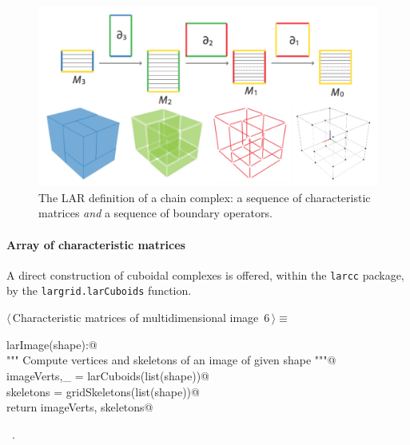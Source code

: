 \documentclass[11pt,oneside]{article}	%
\begin{document}
\begin{figure}[htbp] %
   \centering
   \includegraphics[width=0.7\linewidth]{images/larcomplex} 
   \caption{The LAR definition of  a chain complex: a sequence of characteristic matrices \emph{and} a sequence of boundary operators.}
   \label{fig:example}
\end{figure}

\paragraph{Array of characteristic matrices}

A direct construction of cuboidal complexes is offered, within the \texttt{larcc} package, by the \texttt{largrid.larCuboids} function. 

\begin{flushleft} \small
\begin{minipage}{\linewidth} \label{scrap9}
\protect{}$\langle\,$Characteristic matrices of multidimensional image\nobreak\ {\footnotesize 6}$\,\rangle\equiv$
\vspace{-1ex}
\begin{list}{}{} \item
\mbox{}\verb@def larImage(shape):@\\
\mbox{}\verb@   """ Compute vertices and skeletons of an image of given shape """@\\
\mbox{}\verb@   imageVerts,_ = larCuboids(list(shape))@\\
\mbox{}\verb@   skeletons = gridSkeletons(list(shape))@\\
\mbox{}\verb@   return imageVerts, skeletons@\\
\mbox{}\verb@@{\NWsep}
\end{list}
\vspace{-1ex}
\footnotesize\addtolength{\baselineskip}{-1ex}
\begin{list}{}{\setlength{\itemsep}{-\parsep}\setlength{\itemindent}{-\leftmargin}}
\item \NWtxtMacroRefIn\ .
\end{list}
\end{minipage}\\[4ex]
\end{flushleft}
\end{document}
